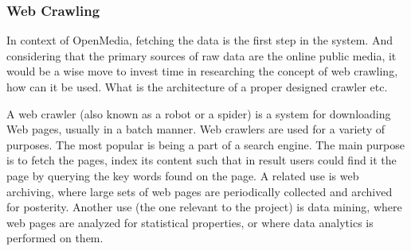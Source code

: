 \subsubsection{Web Crawling}
In context of OpenMedia, fetching the data is the first step in the system. And considering that the primary sources of raw data are the online public media, it would be a wise move to invest time in researching the concept of web crawling, how can it be used. What is the architecture of a proper designed crawler etc.

A web crawler (also known as a robot or a spider) is a system for downloading Web pages, usually in a batch manner. Web crawlers are used for a variety of
purposes. The most popular is being a part of a search engine. The main purpose is to fetch the pages, index its content such that in result users could find it the page by querying the key words found on the page. A related use is web archiving, where large sets of web pages are periodically collected and archived for posterity. Another use (the one relevant to the project) is data mining, where web pages are analyzed for statistical properties, or where data analytics is performed on them.

